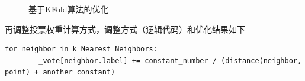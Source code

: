 \documentclass[utf-8]{article}
\begin{document}
\begin{figure}[!h]
	\caption{基于KFold算法的优化}
	\label{fig:2}
\end{figure}

再调整投票权重计算方式，调整方式（逻辑代码）和优化结果如下
\begin{lstlisting}[style = python]
	for neighbor in k_Nearest_Neighbors:
		_vote[neighbor.label] += constant_number / (distance(neighbor, point) + another_constant)
\end{lstlisting}
\end{document}
